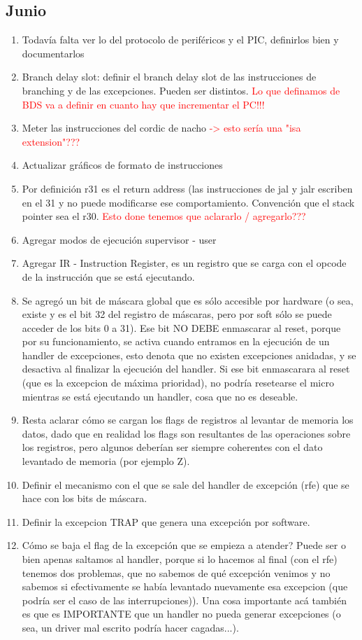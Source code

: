 \subsection{Junio}
\begin{enumerate}
 \item Todavía falta ver lo del protocolo de periféricos y el PIC, definirlos bien y documentarlos
 \item Branch delay slot: definir el branch delay slot de las instrucciones de branching y de las excepciones. Pueden ser distintos. \textcolor{red}{Lo que definamos de BDS va a definir en cuanto hay que incrementar el PC!!!}
 \item Meter las instrucciones del cordic de nacho \textcolor{red}{-> esto sería una "isa extension"???}
 \item Actualizar gráficos de formato de instrucciones
 \item Por definición r31 es el return address (las instrucciones de jal y jalr escriben en el 31 y no puede modificarse ese comportamiento. Convención que el stack pointer sea el r30. \textcolor{red}{Esto done tenemos que aclararlo / agregarlo???}
 \item Agregar modos de ejecución supervisor - user
 \item Agregar IR - Instruction Register, es un registro que se carga con el opcode de la instrucción que se está ejecutando.
 \item Se agregó un bit de máscara global que es sólo accesible por hardware (o sea, existe y es el bit 32 del registro de máscaras, pero
 por soft sólo se puede acceder de los bits 0 a 31). Ese bit NO DEBE enmascarar al reset, porque por su funcionamiento, se activa cuando
 entramos en la ejecución de un handler de excepciones, esto denota que no existen excepciones anidadas, y se desactiva al finalizar la
 ejecución del handler. Si ese bit enmascarara al reset (que es la excepcion de máxima prioridad), no podría resetearse el micro mientras
 se está ejecutando un handler, cosa que no es deseable.
 \item Resta aclarar cómo se cargan los flags de registros al levantar de memoria los datos, dado que en realidad los flags son
 resultantes de las operaciones sobre los registros, pero algunos deberían ser siempre coherentes con el dato levantado de memoria (por
 ejemplo Z).
 \item Definir el mecanismo con el que se sale del handler de excepción (rfe) que se hace con los bits de máscara.
 \item Definir la excepcion TRAP que genera una excepción por software.
 \item Cómo se baja el flag de la excepción que se empieza a atender? Puede ser o bien apenas saltamos al handler, porque si lo hacemos
 al final (con el rfe) tenemos dos problemas, que no sabemos de qué excepción venimos y no sabemos si efectivamente se había levantado
 nuevamente esa excepcion (que podría ser el caso de las interrupciones)). Una cosa importante acá también es que es IMPORTANTE que un
 handler no pueda generar excepciones (o sea, un driver mal escrito podría hacer cagadas...).
\end{enumerate}

